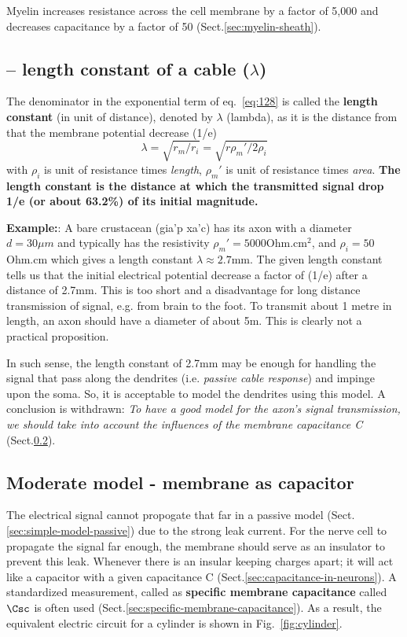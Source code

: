 Myelin increases resistance across the cell membrane by a factor of 5,000 and
decreases capacitance by a factor of 50 (Sect.\ref{sec:myelin-sheath}).



\subsection{-- length constant of a cable ($\lambda$)}

The denominator in the exponential term of eq.~\eqref{eq:128} is called the
{\bf length constant} (in unit of distance), denoted by $\lambda$ (lambda), as
it is the distance from that the membrane potential decrease (1/e)
\begin{equation}
  \lambda = \sqrt{r_m/r_i} = \sqrt{r\rho_m'/2\rho_i}
\end{equation}
with $\rho_i$ is unit of resistance times {\it length}, $\rho_m'$ is
unit of resistance times {\it area}. {\bf The length constant is the
distance at which the transmitted signal drop 1/e (or about 63.2\%) of
its initial magnitude.}

{\bf Example:}: A bare crustacean (gia'p xa'c) has its axon with a diameter
$d=30\mu m$ and typically has the resistivity $\rho_m' = 5000$Ohm.cm$^2$, and
$\rho_i = 50$Ohm.cm which gives a length constant $\lambda \approx 2.7$mm. The
given length constant tells us that the initial electrical potential decrease a
factor of (1/e) after a distance of 2.7mm. This is too short and a disadvantage
for long distance transmission of signal, e.g. from brain to the foot. To
transmit about 1 metre in length, an axon should have a diameter of about 5m.
This is clearly not a practical proposition.

In such sense, the length constant of 2.7mm may be enough for handling
the signal that pass along the dendrites (i.e.
{\it passive cable response}) and impinge upon the soma. So, it is
acceptable to model the dendrites using this model.  A conclusion is
withdrawn: {\it To have a good model for the axon's signal transmission, we
should take into account the influences of the membrane capacitance C}
(Sect.\ref{sec:moder-model-active}).

\subsection{Moderate model - membrane as capacitor}
\label{sec:moder-model-active}

The electrical signal cannot propogate that far in a passive model
(Sect.\ref{sec:simple-model-passive}) due to the strong leak current. For the
nerve cell to propagate the signal far enough, the membrane should serve as
an insulator to prevent this leak.
Whenever there is an insular keeping charges apart; it will act like a capacitor
with a given capacitance C (Sect.\ref{sec:capacitance-in-neurons}). A standardized
measurement, called as {\bf specific membrane capacitance} called $\Csc$ is often used
(Sect.\ref{sec:specific-membrane-capacitance}).
As a result, the equivalent electric circuit for a cylinder is
shown in Fig.~\ref{fig:cylinder}. 

